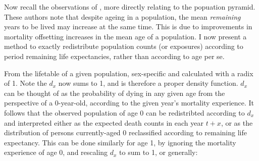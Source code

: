 
Now recall the observations of \citet{sanderson2005average}, more directly
relating to the popuation pyramid. These authors note that despite ageing in a
population, the mean \textit{remaining} years to be lived may increase at the
same time. This is due to improvements in mortality offsetting increases in the
mean age of a population. I now present a method to exactly redistribute
population counts (or exposures) according to period remaining life
expectancies, rather than according to age per se.

From the lifetable of a given population, sex-specific and calculated with a
radix of 1. Note the $d_x$ now sums to 1, and is therefore a proper density
function. $d_x$ can be thought of as the probability of dying in any given age
from the perspective of a 0-year-old, according to the given year's mortality
experience. It follows that the observed population of age 0 can be redistribted
according to $d_x$ and interpreted either as the expected death counts
in each year $t+x$, or as the distribution of persons currently-aged 0
reclassified according to remaining life expectancy. This can be done similarly
for age 1, by ignoring the mortality experience of age 0, and rescaling $d_x$ to
sum to 1, or generally:


